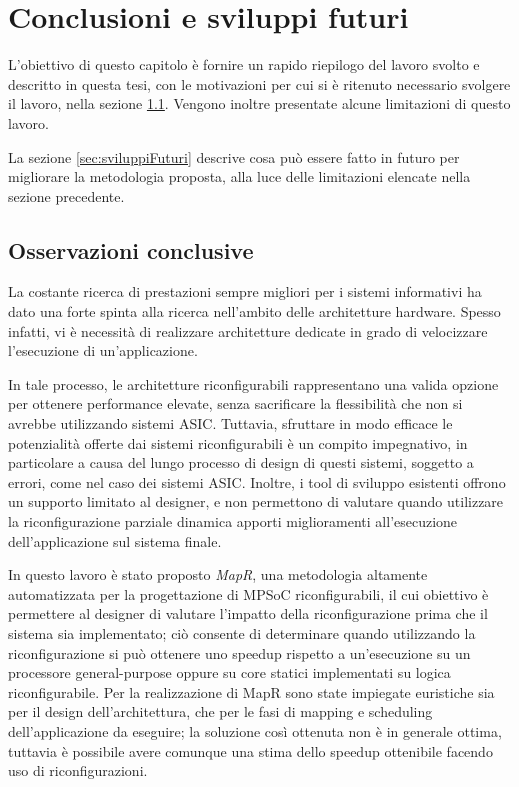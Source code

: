 \chapter{Conclusioni e sviluppi futuri}
\label{chap:conclusioni}
\vspace{1cm}
L'obiettivo di questo capitolo \`e fornire un rapido riepilogo del lavoro svolto
e descritto in questa tesi, con le motivazioni per cui si \`e ritenuto necessario
svolgere il lavoro, nella sezione \ref{sec:osservazioniConclusiveCap7}. Vengono inoltre
presentate alcune limitazioni di questo lavoro.

La sezione \ref{sec:sviluppiFuturi} descrive cosa pu\`o essere fatto in futuro
per migliorare la metodologia proposta, alla luce delle limitazioni elencate
nella sezione precedente.

\newpage


\section{Osservazioni conclusive}
\label{sec:osservazioniConclusiveCap7}
La costante ricerca di prestazioni sempre migliori per i sistemi informativi
ha dato una forte spinta alla ricerca nell'ambito delle architetture hardware.
Spesso infatti, vi \`e necessit\`a di realizzare architetture dedicate in grado di
velocizzare l'esecuzione di un'applicazione.

In tale processo, le architetture riconfigurabili rappresentano una valida opzione
per ottenere performance elevate, senza sacrificare la flessibilit\`a che non si avrebbe
utilizzando sistemi \ac{ASIC}. Tuttavia, sfruttare in modo efficace le potenzialit\`a
offerte dai sistemi riconfigurabili \`e un compito impegnativo, in particolare a causa
del lungo processo di design di questi sistemi, soggetto a errori, come nel caso dei sistemi
\ac{ASIC}.
Inoltre, i tool di sviluppo esistenti offrono un supporto limitato al designer, e non permettono
di valutare quando utilizzare la riconfigurazione parziale dinamica apporti miglioramenti
all'esecuzione dell'applicazione sul sistema finale.

In questo lavoro \`e stato proposto \emph{MapR}, una metodologia
altamente automatizzata per la progettazione di \acs{MPSoC} riconfigurabili, il cui
obiettivo \`e permettere al designer di valutare l'impatto della riconfigurazione prima che il sistema
sia implementato; ci\`o consente di determinare quando utilizzando la riconfigurazione si pu\`o
ottenere uno speedup rispetto a un'esecuzione su un processore general-purpose oppure
su core statici implementati su logica riconfigurabile.
Per la realizzazione di MapR sono state impiegate euristiche sia per il design dell'architettura, che per
le fasi di mapping e scheduling dell'applicazione da eseguire; la soluzione cos\`i ottenuta non \`e
in generale ottima, tuttavia \`e possibile avere comunque una stima dello speedup ottenibile
facendo uso di riconfigurazioni.

